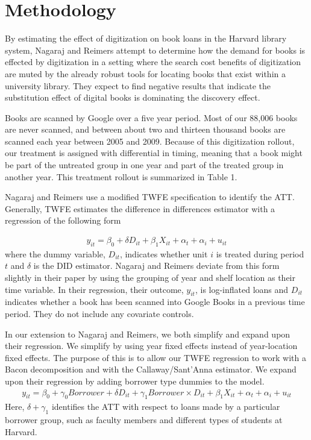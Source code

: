 \documentclass{article}
\begin{document}
\section{Methodology}
By estimating the effect of digitization on book loans in the Harvard library system, Nagaraj and Reimers attempt to determine how the demand for books is effected by digitization in a setting where the search cost benefits of digitization are muted by the already robust tools for locating books that exist within a university library. They expect to find negative results that indicate the substitution effect of digital books is dominating the discovery effect. 

Books are scanned by Google over a five year period. Most of our 88,006 books are never scanned, and between about two and thirteen thousand books are scanned each year between 2005 and 2009. Because of this digitization rollout, our treatment is assigned with differential in timing, meaning that a book might be part of the untreated group in one year and part of the treated group in another year. This treatment rollout is summarized in Table 1.


Nagaraj and Reimers use a modified TWFE specification to identify the ATT.  Generally, TWFE estimates the difference in differences estimator with a regression of the following form

\begin{align}
	y_{it} = \beta_0 + \delta D_{it} + \beta_1X_{it} + \alpha_t  +  \alpha_i + u_{it}
\end{align}
where the dummy variable, $D_{it}$,  indicates whether unit $i$ is treated during period $t$ and $\delta$ is the DID estimator. Nagaraj and Reimers deviate from this form slightly in their paper by using the grouping of year and shelf location as their time variable. In their regression, their outcome, $y_{it}$, is log-inflated loans and $D_{it}$ indicates whether a book has been scanned into Google Books in a previous time period. They do not include any covariate controls. 

In our extension to Nagaraj and Reimers, we both simplify and expand upon their regression. We simplify by using year fixed effects instead of year-location fixed effects. The purpose of this is to allow our TWFE regression to work with a Bacon decomposition and with the Callaway/Sant'Anna estimator. We expand upon their regression by adding borrower type dummies to the model. 
\begin{align}
	y_{it} = \beta_0 + \gamma_0Borrower + \delta D_{it} + \gamma_1Borrower\times D_{it} + \beta_1X_{it} + \alpha_t  +  \alpha_i + u_{it}
\end{align}
Here, $\delta + \gamma_1$ identifies the ATT with respect to loans made by a particular borrower group, such as faculty members and different types of students at Harvard. 
\end{document}
